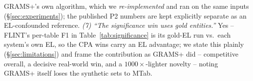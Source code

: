 GRAMS+'s own algorithm, which we \emph{re-implemented} and ran on the same inputs
(\S\ref{sec:experiments}); the published P2 numbers are kept explicitly separate as an
EL-confounded reference.
\emph{(7) ``The significance win uses gold entities.''} Yes -- FLINT's per-table F1 in
Table~\ref{tab:significance} is its gold-EL run vs.\ each system's own EL, so the CPA
wins carry an EL advantage; we state this plainly (\S\ref{sec:limitations}) and frame
the contribution as GRAMS+ did -- competitive overall, a decisive real-world win, and a
$1000\times$-lighter novelty -- noting GRAMS+ itself loses the synthetic sets to MTab.
